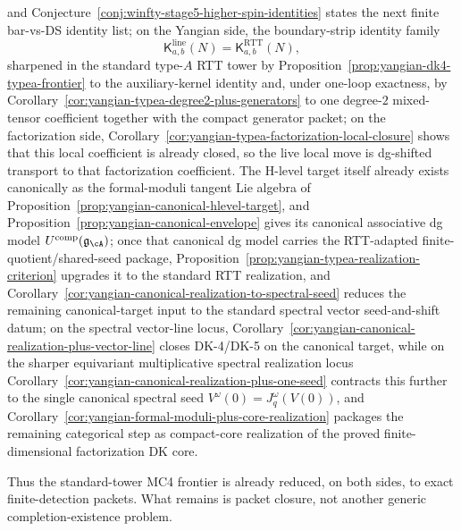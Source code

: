 \begin{proposition}
\begin{enumerate}[label=\textup{(\alph*)}]
  and
  Conjecture~\ref{conj:winfty-stage5-higher-spin-identities} states the
  next finite bar-vs-DS identity list; on the
  Yangian side, the boundary-strip identity family
  \[
  \mathsf{K}^{\mathrm{line}}_{a,b}(N)
  =
  \mathsf{K}^{\mathrm{RTT}}_{a,b}(N),
  \]
  sharpened in the standard type-$A$ RTT tower by
  Proposition~\ref{prop:yangian-dk4-typea-frontier} to the
  auxiliary-kernel identity and, under one-loop exactness, by
  Corollary~\ref{cor:yangian-typea-degree2-plus-generators} to one
  degree-$2$ mixed-tensor coefficient together with the compact
  generator packet; on the factorization side,
  Corollary~\ref{cor:yangian-typea-factorization-local-closure}
  shows that this local coefficient is already closed, so the live
  local move is dg-shifted transport to that factorization coefficient.
  The H-level target itself already exists canonically as the
  formal-moduli tangent Lie algebra of
  Proposition~\ref{prop:yangian-canonical-hlevel-target}, and
  Proposition~\ref{prop:yangian-canonical-envelope} gives its canonical
  associative dg model
  \(U^{\mathrm{comp}}(\mathfrak{g}_{\cA})\); once that canonical dg
  model carries the RTT-adapted finite-quotient/shared-seed package,
  Proposition~\ref{prop:yangian-typea-realization-criterion}
  upgrades it to the standard RTT realization, and
  Corollary~\ref{cor:yangian-canonical-realization-to-spectral-seed}
  reduces the remaining canonical-target input to the standard
  spectral vector seed-and-shift datum; on the spectral vector-line
  locus,
  Corollary~\ref{cor:yangian-canonical-realization-plus-vector-line}
  closes DK-4/DK-5 on the canonical target, while on the sharper
  equivariant multiplicative spectral realization locus
  Corollary~\ref{cor:yangian-canonical-realization-plus-one-seed}
  contracts this further to the single canonical spectral seed
  \(V^\omega(0)=J_q^\omega(V(0))\), and
  Corollary~\ref{cor:yangian-formal-moduli-plus-core-realization}
  packages the remaining categorical step as compact-core realization
  of the proved finite-dimensional factorization DK core.
\end{enumerate}
Thus the standard-tower MC4 frontier is already reduced, on both sides,
to exact finite-detection packets.  What remains is packet closure, not
another generic completion-existence problem.
\end{proposition}

